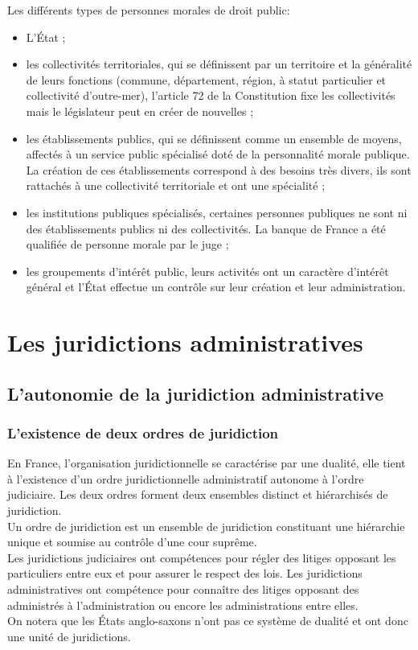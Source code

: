 \documentclass[12pt, a4paper, openany]{book}
\begin{document}
Les différents types de personnes morales de droit public:
\begin{itemize}
\item L'État ;
\item les collectivités territoriales, qui se définissent par un territoire et la généralité de leurs fonctions (commune, département, région, à statut particulier et collectivité d'outre-mer), l'article 72 de la Constitution fixe les collectivités mais le législateur peut en créer de nouvelles ;
\item les établissements publics, qui se définissent comme un ensemble de moyens, affectés à un service public spécialisé doté de la personnalité morale publique. La création de ces établissements correspond à des besoins très divers, ils sont rattachés à une collectivité territoriale et ont une spécialité ;
\item les institutions publiques spécialisés, certaines personnes publiques ne sont ni des établissements publics ni des collectivités. La banque de France a été qualifiée de personne morale par le juge ;
\item les groupements d'intérêt public, leurs activités ont un caractère d'intérêt général et l'État effectue un contrôle sur leur création et leur administration. 
\end{itemize}

\part{Les juridictions administratives}

\chapter{L'autonomie de la juridiction administrative}

\section{L'existence de deux ordres de juridiction}

En France, l'organisation juridictionnelle se caractérise par une dualité, elle tient à l'existence d'un ordre juridictionnelle administratif autonome à l'ordre judiciaire. Les deux ordres forment deux ensembles distinct et hiérarchisés de juridiction. \\
Un ordre de juridiction est un ensemble de juridiction constituant une hiérarchie unique et soumise au contrôle d'une cour suprême. \\
Les juridictions judiciaires ont compétences pour régler des litiges opposant les particuliers entre eux et pour assurer le respect des lois. Les juridictions administratives ont compétence pour connaître des litiges opposant des administrés à l'administration ou encore les administrations entre elles. \\
On notera que les États anglo-saxons n'ont pas ce système de dualité et ont donc une unité de juridictions. 
\end{document}
